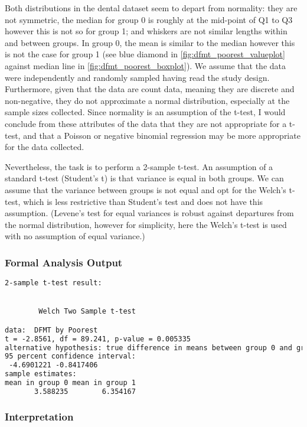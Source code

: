 \documentclass[11pt]{article}
\begin{document}
Both distributions in the dental dataset seem to depart from normality: they are not symmetric, the median for group 0 is roughly at the mid-point of Q1 to Q3 however this is not so for group 1; and whiskers are not similar lengths within and between groups. In group 0, the mean is similar to the median however this is not the case for group 1 (see blue diamond in \ref{fig:dfmt_poorest_valueplot} against median line in \ref{fig:dfmt_poorest_boxplot}). We assume that the data were independently and randomly sampled having read the study design. Furthermore, given that the data are count data, meaning they are discrete and non-negative, they do not approximate a normal distribution, especially at the sample sizes collected.  Since normality is an assumption of the t-test, I would conclude from these attributes of the data that they are not appropriate for a t-test, and that a Poisson or negative binomial regression may be more appropriate for the data collected.

Nevertheless, the task is to perform a 2-sample t-test. An assumption of a standard t-test (Student's t) is that variance is equal in both groups. We can assume that the variance between groups is not equal and opt for the Welch's t-test, which is less restrictive than Student's test and does not have this assumption. (Levene's test for equal variances is robust against departures from the normal distribution, however for simplicity, here the Welch's t-test is used with no assumption of equal variance.)

\subsubsection*{Formal Analysis Output}
\begin{lstlisting}[language=TeX, caption={R output for Welch 2-sample t-test}]
2-sample t-test result:


        Welch Two Sample t-test

data:  DFMT by Poorest
t = -2.8561, df = 89.241, p-value = 0.005335
alternative hypothesis: true difference in means between group 0 and group 1 is not equal to 0
95 percent confidence interval:
 -4.6901221 -0.8417406
sample estimates:
mean in group 0 mean in group 1 
       3.588235        6.354167 
\end{lstlisting}

\subsubsection*{Interpretation}
\end{document}
